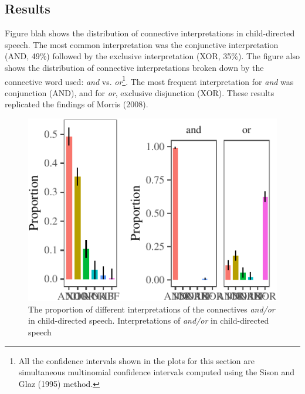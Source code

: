 \documentclass[,man,floatsintext]{apa6}
\let\rmarkdownfootnote\footnote%
\def\footnote{\protect\rmarkdownfootnote}
\begin{document}
\hypertarget{results}{%
\subsection{Results}\label{results}}

Figure blah shows the distribution of connective interpretations in child-directed speech. The most common interpretation was the conjunctive interpretation (AND, 49\%) followed by the exclusive interpretation (XOR, 35\%). The figure also shows the distribution of connective interpretations broken down by the connective word used: \emph{and} vs. \emph{or}\footnote{All the confidence intervals shown in the plots for this section are simultaneous multinomial confidence intervals computed using the Sison and Glaz (1995) method.}. The most frequent interpretation for \emph{and} was conjunction (AND), and for \emph{or}, exclusive disjunction (XOR). These results replicated the findings of Morris (2008).

\begin{figure}[tb]

{\centering \includegraphics{figs/interpretationPlot-1} 

}

\caption{The proportion of different interpretations of the connectives \textit{and/or} in child-directed speech. Interpretations of \textit{and/or} in child-directed speech}\label{fig:interpretationPlot}
\end{figure}
\end{document}
